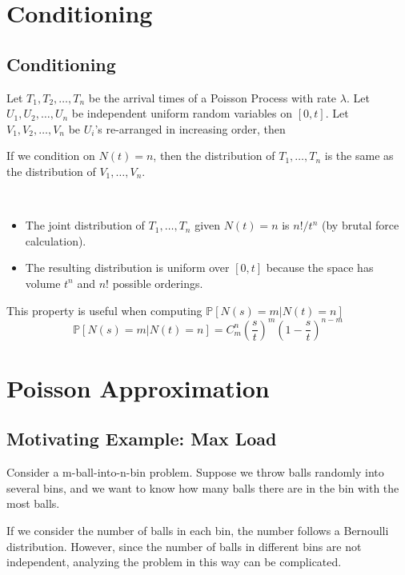 \section{Conditioning}

    \subsection{Conditioning}
        Let $T_1, T_2, \dots, T_n$ be the arrival times of a Poisson Process with rate $\lambda$. Let $U_1, U_2, \dots, U_n$ be independent uniform random variables on $[0,t]$. Let $V_1, V_2, \dots, V_n$ be $U_i$'s re-arranged in increasing order, then
        \begin{theorem}[Conditioning]\label{Thm:ConditioningOfPoissonProcess}
            If we condition on $N(t)=n$, then the distribution of $T_1, \dots, T_n$ is the same as the distribution of $V_1, \dots, V_n$.
        \end{theorem}
        \begin{sketchproof}~{}
            \begin{itemize}
                \item The joint distribution of $T_1,\dots,T_n$ given $N(t)=n$ is $n!/t^n$ (by brutal force calculation).
                \item The resulting distribution is uniform over $[0,t]$ because the space has volume $t^n$ and $n!$ possible orderings.
            \end{itemize}
        \end{sketchproof}
        \begin{remark}
            This property is useful when computing $\mathbb{P}[N(s)=m|N(t)=n]$
            \[ \mathbb{P}[N(s)=m|N(t)=n] = C^n_m \left(\frac{s}{t}\right)^m\left(1-\frac{s}{t}\right)^{n-m} \]
        \end{remark}


\section{Poisson Approximation}
    \subsection{Motivating Example: Max Load}\label{subsec:m-balls-in-n-bins}
        Consider a m-ball-into-n-bin problem. Suppose we throw balls randomly into several bins, and we want to know how many balls there are in the bin with the most balls.

        If we consider the number of balls in each bin, the number follows a Bernoulli distribution. However, since the number of balls in different bins are not independent, analyzing the problem in this way can be complicated.

